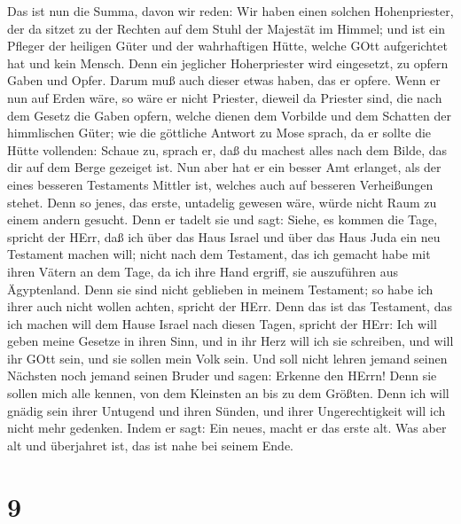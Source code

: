 Das ist nun die Summa, davon wir reden: Wir haben einen
solchen Hohenpriester, der da sitzet zu der Rechten auf dem Stuhl der
Majestät im Himmel;  und ist ein Pfleger der heiligen Güter
und der wahrhaftigen Hütte, welche GOtt aufgerichtet hat und kein
Mensch.  Denn ein jeglicher Hoherpriester wird eingesetzt,
zu opfern Gaben und Opfer. Darum muß auch dieser etwas haben, das er
opfere.  Wenn er nun auf Erden wäre, so wäre er nicht
Priester, dieweil da Priester sind, die nach dem Gesetz die Gaben
opfern,  welche dienen dem Vorbilde und dem Schatten der
himmlischen Güter; wie die göttliche Antwort zu Mose sprach, da er
sollte die Hütte vollenden: Schaue zu, sprach er, daß du machest alles
nach dem Bilde, das dir auf dem Berge gezeiget ist.  Nun
aber hat er ein besser Amt erlanget, als der eines besseren Testaments
Mittler ist, welches auch auf besseren Verheißungen stehet. 
Denn so jenes, das erste, untadelig gewesen wäre, würde nicht Raum zu
einem andern gesucht.  Denn er tadelt sie und sagt: Siehe,
es kommen die Tage, spricht der HErr, daß ich über das Haus Israel und
über das Haus Juda ein neu Testament machen will;  nicht
nach dem Testament, das ich gemacht habe mit ihren Vätern an dem Tage,
da ich ihre Hand ergriff, sie auszuführen aus Ägyptenland. Denn sie sind
nicht geblieben in meinem Testament; so habe ich ihrer auch nicht wollen
achten, spricht der HErr.  Denn das ist das Testament, das
ich machen will dem Hause Israel nach diesen Tagen, spricht der HErr:
Ich will geben meine Gesetze in ihren Sinn, und in ihr Herz will ich sie
schreiben, und will ihr GOtt sein, und sie sollen mein Volk sein.
 Und soll nicht lehren jemand seinen Nächsten noch jemand
seinen Bruder und sagen: Erkenne den HErrn! Denn sie sollen mich alle
kennen, von dem Kleinsten an bis zu dem Größten.  Denn ich
will gnädig sein ihrer Untugend und ihren Sünden, und ihrer
Ungerechtigkeit will ich nicht mehr gedenken.  Indem er
sagt: Ein neues, macht er das erste alt. Was aber alt und überjahret
ist, das ist nahe bei seinem Ende.

\hypertarget{section-7}{%
\section{9}\label{section-7}}

